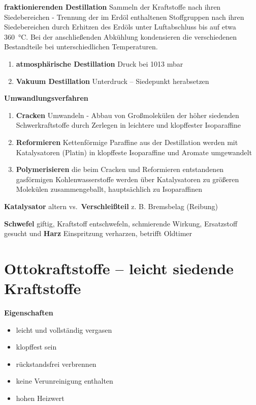 \textbf{fraktionierenden Destillation} Sammeln der Kraftstoffe nach
ihren Siedebereichen - Trennung der im Erdöl enthaltenen Stoffgruppen
nach ihren Siedebereichen durch Erhitzen des Erdöls unter Luftabschluss
bis auf etwa 360~°C. Bei der anschließenden Abkühlung kondensieren die
verschiedenen Bestandteile bei unterschiedlichen Temperaturen.

\begin{enumerate}
\item
  \textbf{atmosphärische Destillation} Druck bei 1013 mbar
\item
  \textbf{Vakuum Destillation} Unterdruck -- Siedepunkt herabsetzen
\end{enumerate}

\textbf{Umwandlungsverfahren}

\begin{enumerate}
\item
  \textbf{Cracken} Umwandeln - Abbau von Großmolekülen der höher
  siedenden Schwerkraftstoffe durch Zerlegen in leichtere und
  klopffester Isoparaffine
\item
  \textbf{Reformieren} Kettenförmige Paraffine aus der Destillation
  werden mit Katalysatoren (Platin) in klopffeste Isoparaffine und
  Aromate umgewandelt
\item
  \textbf{Polymerisieren} die beim Cracken und Reformieren entstandenen
  gasförmigen Kohlenwasserstoffe werden über Katalysatoren zu größeren
  Molekülen zusammengeballt, hauptsächlich zu Isoparaffinen
\end{enumerate}

\textbf{Katalysator} altern vs.~\textbf{Verschleißteil} z. B. Bremsbelag
(Reibung)

\textbf{Schwefel} giftig, Kraftstoff entschwefeln, schmierende Wirkung,
Ersatzstoff gesucht und \textbf{Harz} Einspritzung verharzen, betrifft
Oldtimer

\section{Ottokraftstoffe -- leicht siedende
Kraftstoffe}\label{ottokraftstoffe-leicht-siedende-kraftstoffe}

\textbf{Eigenschaften}

\begin{itemize}
\item
  leicht und vollständig vergasen
\item
  klopffest sein
\item
  rückstandsfrei verbrennen
\item
  keine Verunreinigung enthalten
\item
  hohen Heizwert
\end{itemize}

